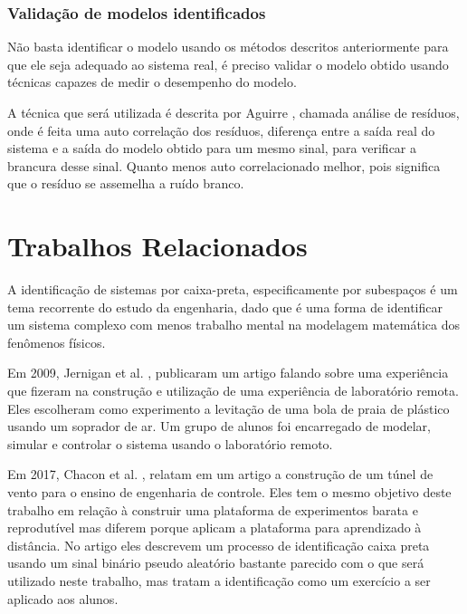 \subsubsection{Validação de modelos identificados}

Não basta identificar o modelo usando os métodos descritos anteriormente para que ele seja adequado ao sistema real, é preciso validar o modelo obtido usando técnicas capazes de medir o desempenho do modelo.


A técnica que será utilizada é descrita por Aguirre \cite{aguirre2015}, chamada análise de resíduos, onde é feita uma auto correlação dos resíduos, diferença entre a saída real do sistema e a saída do modelo obtido para um mesmo sinal, para verificar a brancura desse sinal. Quanto menos auto correlacionado melhor, pois significa que o resíduo se assemelha a ruído branco.

\section{Trabalhos Relacionados}


A identificação de sistemas por caixa-preta, especificamente por subespaços é um tema recorrente do estudo da engenharia, dado que é uma forma de identificar um sistema complexo com menos trabalho mental na modelagem matemática dos fenômenos físicos.


Em 2009, Jernigan et al. \cite{jernigan2009}, publicaram um artigo falando sobre uma experiência que fizeram na construção e utilização de uma experiência de laboratório remota. Eles escolheram como experimento a levitação de uma bola de praia de plástico usando um soprador de ar. Um grupo de alunos foi encarregado de modelar, simular e controlar o sistema usando o laboratório remoto. 


Em 2017, Chacon et al. \cite{chacon2017}, relatam em um artigo a construção de um túnel de vento para o ensino de engenharia de controle. Eles tem o mesmo objetivo deste trabalho em relação à construir uma plataforma de experimentos barata e reprodutível mas diferem porque aplicam a plataforma para aprendizado à distância. No artigo eles descrevem um processo de identificação caixa preta usando um sinal binário pseudo aleatório bastante parecido com o que será utilizado neste trabalho, mas tratam a identificação como um exercício a ser aplicado aos alunos.


















